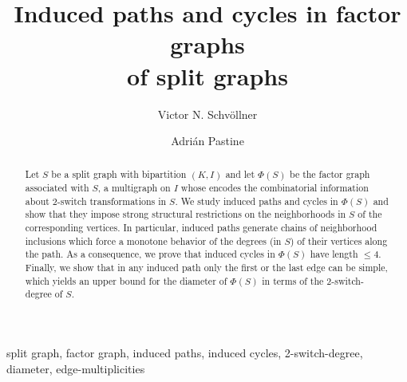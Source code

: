 \documentclass[11pt]{elsarticle}
\begin{document}
	\begin{frontmatter}
		\title {
			Induced paths and cycles in factor graphs \\ of split graphs
		}
		\address[IMASL]{Instituto de Matem\'atica Aplicada San Luis - CONICET, UNSL (San Luis, Argentina)}
		\address[DEPTO]{Departamento de Matem\'atica, Universidad Nacional de San Luis, San Luis, Argentina.}
		
		
		\author[IMASL,DEPTO]{Victor N. Schvöllner} 
		\author[IMASL]{Adri\'an Pastine} 
		
		
		\begin{abstract}
			Let $S$ be a split graph with bipartition $(K,I)$ and let $\Phi(S)$ be the factor graph associated with $S$, a multigraph on $I$ whose encodes the combinatorial information about 2-switch transformations in $S$.	We study induced paths and cycles in $\Phi(S)$ and show that they impose strong structural restrictions on the neighborhoods in $S$ of the corresponding vertices. In particular, induced paths generate chains of neighborhood inclusions which force a monotone behavior of the degrees (in $S$) of their vertices along the path. As a consequence, we prove that induced cycles in $\Phi(S)$ have length $\leq 4$. Finally, we show that in any induced path only the first or the last edge can be simple, which yields an upper bound for the diameter of $\Phi(S)$ in terms of the 2-switch-degree of $S$.
%			
		\end{abstract}
		
		\begin{keyword} 
			split graph, factor graph, induced paths, induced cycles, 2-switch-degree, diameter, edge-multiplicities
		\end{keyword}		
	\end{frontmatter}	
	
\end{document}
